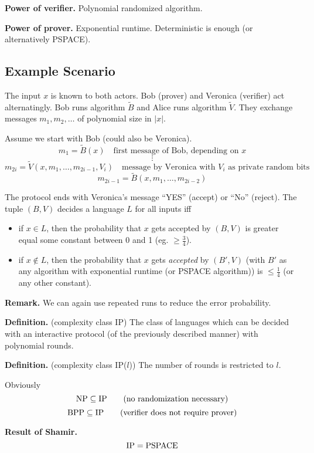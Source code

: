 \documentclass[a4paper]{article}
\newcommand{\cls}[1]{\rm{#1}}
\begin{document}
\textbf{Power of verifier.}
  Polynomial randomized algorithm.

\textbf{Power of prover.}
  Exponential runtime. Deterministic is enough (or alternatively
  PSPACE).

\subsection{Example Scenario}
%
The input $x$ is known to both actors. Bob (prover) and Veronica
(verifier) act alternatingly. Bob runs algorithm $\tilde{B}$ and
Alice runs algorithm $\tilde{V}$. They exchange messages $m_1,
m_2, \ldots$ of polynomial size in $|x|$.

Assume we start with Bob (could also be Veronica).
\[
  m_1 = \tilde{B}(x)   \quad\text{first message of Bob, depending on }x
\] \[
  \vdots
\] \[
  m_{2i} = \tilde{V}(x, m_1, \ldots, m_{2i-1}, V_i)
      \quad\text{message by Veronica with $V_i$ as private random bits}
\] \[
  m_{2i-1} = \tilde{B}(x, m_1, \ldots, m_{2i-2})
\]

The protocol ends with Veronica's message ``YES'' (accept) or
``No'' (reject). The tuple $(B, V)$ decides a language $L$
for all inputs iff
\begin{itemize}
  \item if $x \in L$, then the probability that $x$ gets accepted
        by $(B, V)$ is greater equal some constant between 0 and 1
        (eg. $\geq \frac34$).
  \item if $x \notin L$, then the probability that $x$ gets \emph{accepted}
        by $(B', V)$ (with $B'$ as any algorithm with exponential runtime
        (or PSPACE algorithm)) is $\leq \frac14$ (or any other constant).
\end{itemize}

\textbf{Remark.}
  We can again use repeated runs to reduce the error probability.

\textbf{Definition.} (complexity class \cls{IP})
  The class of languages which can be decided with an interactive protocol
  (of the previously described manner) with polynomial rounds.

\textbf{Definition.} (complexity class \cls{IP($l$)})
  The number of rounds is restricted to $l$.

Obviously
\[
  \cls{NP} \subseteq \cls{IP}  \qquad \text{(no randomization necessary)}
\] \[
  \cls{BPP} \subseteq \cls{IP}  \qquad \text{(verifier does not require prover)}
\]

\textbf{Result of Shamir.}
\[
  \cls{IP} = \cls{PSPACE}
\]
\end{document}

